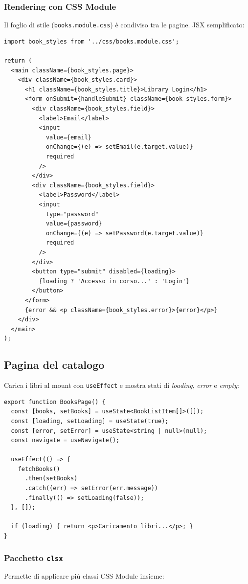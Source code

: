 \documentclass[11pt,a4paper]{article}
\begin{document}
\subsubsection{Rendering con CSS Module}
Il foglio di stile (\texttt{books.module.css}) \`e condiviso tra le pagine. JSX semplificato:

\begin{lstlisting}[language=tsx]
import book_styles from '../css/books.module.css';

return (
  <main className={book_styles.page}>
    <div className={book_styles.card}>
      <h1 className={book_styles.title}>Library Login</h1>
      <form onSubmit={handleSubmit} className={book_styles.form}>
        <div className={book_styles.field}>
          <label>Email</label>
          <input
            value={email}
            onChange={(e) => setEmail(e.target.value)}
            required
          />
        </div>
        <div className={book_styles.field}>
          <label>Password</label>
          <input
            type="password"
            value={password}
            onChange={(e) => setPassword(e.target.value)}
            required
          />
        </div>
        <button type="submit" disabled={loading}>
          {loading ? 'Accesso in corso...' : 'Login'}
        </button>
      </form>
      {error && <p className={book_styles.error}>{error}</p>}
    </div>
  </main>
);
\end{lstlisting}

\subsection{Pagina del catalogo}

Carica i libri al mount con \texttt{useEffect} e mostra stati di \emph{loading}, \emph{error} e \emph{empty}:

\begin{lstlisting}[language=tsx]
export function BooksPage() {
  const [books, setBooks] = useState<BookListItem[]>([]);
  const [loading, setLoading] = useState(true);
  const [error, setError] = useState<string | null>(null);
  const navigate = useNavigate();

  useEffect(() => {
    fetchBooks()
      .then(setBooks)
      .catch((err) => setError(err.message))
      .finally(() => setLoading(false));
  }, []);

  if (loading) { return <p>Caricamento libri...</p>; }
}
\end{lstlisting}

\subsubsection{Pacchetto \texttt{clsx}}
Permette di applicare pi\`u classi CSS Module insieme:
\end{document}
